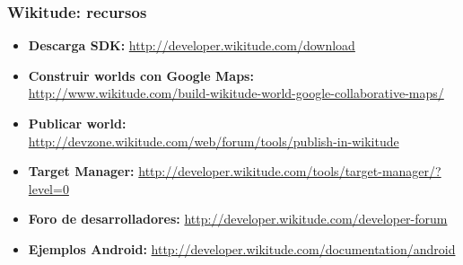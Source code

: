 \frame
{
\frametitle{Wikitude: recursos}
\begin{itemize}
\item \textbf{Descarga SDK:} \url{http://developer.wikitude.com/download}
\item \textbf{Construir worlds con Google Maps:} \\\url{http://www.wikitude.com/build-wikitude-world-google-collaborative-maps/}
\item \textbf{Publicar world:} \\\url{http://devzone.wikitude.com/web/forum/tools/publish-in-wikitude}
\item \textbf{Target Manager:} \url{http://developer.wikitude.com/tools/target-manager/?level=0}
\item \textbf{Foro de desarrolladores:} \url{http://developer.wikitude.com/developer-forum}
\item \textbf{Ejemplos Android:} \url{http://developer.wikitude.com/documentation/android}
\end{itemize}
}
